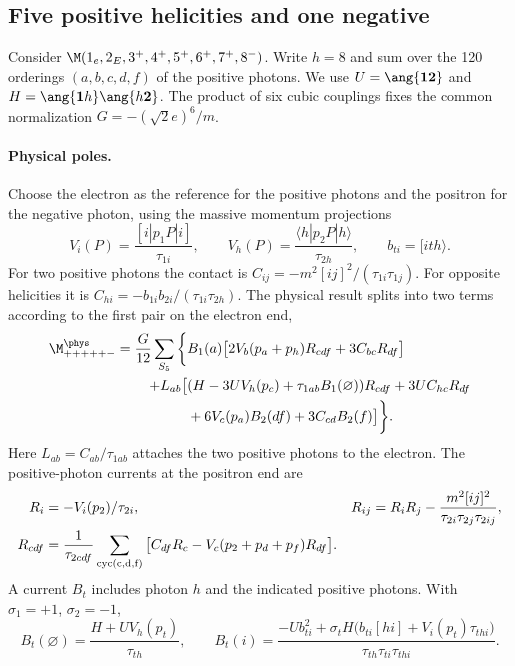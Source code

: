 \subsection{Five positive helicities and one negative}\label{sec:eight-one-minus}
Consider $\M(1_e,2_E,3^+,4^+,5^+,6^+,7^+,8^-)$. Write $h=8$ and sum
over the 120 orderings $(a,b,c,d,f)$ of the positive photons. We use
$U=\ang{\mathbf1\mathbf2}$ and $H=\ang{\mathbf1 h}\ang{h\mathbf2}$.
The product of six cubic couplings fixes the common normalization
$G=-(\sqrt2 e)^6/m$.

\paragraph{Physical poles.}
Choose the electron as the reference for the positive photons and the
positron for the negative photon, using the massive momentum projections
\[
 V_i(P)=\frac{[i|p_1 P|i]}{\tau_{1i}},\qquad
 V_h(P)=\frac{\langle h|p_2 P|h\rangle}{\tau_{2h}},\qquad
 b_{ti}=[ith\rangle .
\]
For two positive photons the contact is
$C_{ij}=-m^2[ij]^2/(\tau_{1i}\tau_{1j})$. For opposite helicities
it is $C_{hi}=-b_{1i}b_{2i}/(\tau_{1i}\tau_{2h})$.
The physical result splits into two terms according to the first pair
on the electron end,
\begin{equation}\label{eq:eight-one-physical}
\begin{aligned}
 \M^{\phys}_{+++++-}=\frac{G}{12}\sum_{S_5}\bigg\{&
 B_1(a)\big[2V_b(p_a+p_h)R_{cdf}+3C_{bc}R_{df}\big] \\
 +L_{ab}\big[&
 (H-3U V_h(p_c)+\tau_{1ab}B_1(\varnothing))R_{cdf}
 +3U C_{hc}R_{df}\\
 &+6V_c(p_a)B_2(df)+3C_{cd}B_2(f)\big]\bigg\}.
\end{aligned}
\end{equation}
Here $L_{ab}=C_{ab}/\tau_{1ab}$ attaches the two positive photons to the
electron. The positive-photon currents at the positron end are
\begin{align}
 R_i&=-V_i(p_2)/\tau_{2i},&
 R_{ij}&=R_iR_j-\frac{m^2[ij]^2}{\tau_{2i}\tau_{2j}\tau_{2ij}},
 \nonumber\\
 R_{cdf}&=\frac{1}{\tau_{2cdf}}\sum_{\rm cyc(c,d,f)}
    \big[C_{df}R_c-V_c(p_2+p_d+p_f)R_{df}\big].
 \label{eq:eight-one-right}
\end{align}
A current $B_t$ includes photon $h$ and the indicated positive photons.
With $\sigma_1=+1$, $\sigma_2=-1$,
\[
 B_t(\varnothing)=\frac{H+U V_h(p_t)}{\tau_{th}},\qquad
 B_t(i)=\frac{-U b_{ti}^2+\sigma_t H\big(b_{ti}[hi]+V_i(p_t)\tau_{thi}\big)}
                  {\tau_{th}\tau_{ti}\tau_{thi}} .
\]
